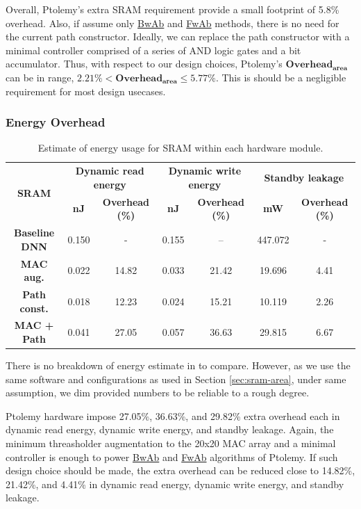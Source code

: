 \documentclass[11pt]{article}
\begin{document}
Overall, Ptolemy's extra SRAM requirement provide a small footprint of 5.8\% overhead. Also, if assume only \underline{BwAb} and \underline{FwAb} methods, there is no need for the current path constructor. Ideally, we can replace the path constructor with a minimal controller comprised of a series of AND logic gates and a bit accumulator. Thus, with respect to our design choices, Ptolemy's $\mathbf{Overhead_{area}}$ can be in range, $2.21\%<\mathbf{Overhead_{area}}\leq5.77\%$. This is should be a negligible requirement for most design usecases.

\subsubsection{Energy Overhead}

\begin{table}[H]
  \begin{tabular}{ccccccc}
  \toprule
  \multirow{2}{*}{\textbf{SRAM}} & \multicolumn{2}{c}{\textbf{Dynamic read energy}} & \multicolumn{2}{c}{\textbf{Dynamic write energy}} & \multicolumn{2}{c}{\textbf{Standby leakage}} \\ \cline{2-7} 
   & \textbf{nJ} & \textbf{Overhead (\%)} & \textbf{nJ} & \textbf{Overhead (\%)} & \textbf{mW} & \textbf{Overhead (\%)} \\ \hline
  \textbf{Baseline DNN} & 0.150 & - & 0.155 & -- & 447.072 & - \\ \hline
  \textbf{MAC aug.} & 0.022 & 14.82 & 0.033 & 21.42 & 19.696 & 4.41 \\
  \textbf{Path const.} & 0.018 & 12.23 & 0.024 & 15.21 & 10.119 & 2.26 \\ \hline
  \textbf{MAC + Path} & 0.041 & 27.05 & 0.057 & 36.63 & 29.815 & 6.67 \\ \bottomrule
  \end{tabular}
  \caption{Estimate of energy usage for SRAM within each hardware module. \label{tab:sram-energy}}
  \end{table}

  There is no breakdown of energy estimate in \cite{ptolemy} to compare. However, as we use the same software and configurations as used in Section \ref{sec:sram-area}, under same assumption, we dim provided numbers to be reliable to a rough degree.

  Ptolemy hardware impose 27.05\%, 36.63\%, and 29.82\% extra overhead each in dynamic read energy, dynamic write energy, and standby leakage. Again, the minimum threasholder augmentation to the 20x20 MAC array and a minimal controller is enough to power \underline{BwAb} and \underline{FwAb} algorithms of Ptolemy. If such design choice should be made, the extra overhead can be reduced close to 14.82\%, 21.42\%, and 4.41\% in dynamic read energy, dynamic write energy, and standby leakage.
  
\end{document}
